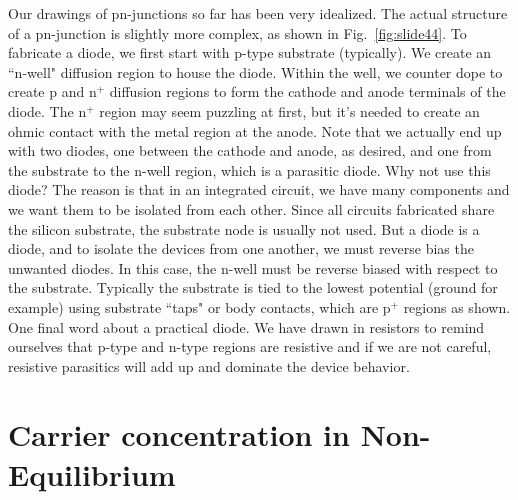 Our drawings of pn-junctions so far has been very idealized.  The actual structure of a pn-junction is slightly more complex, as shown in Fig.~\ref{fig:slide44}.  To fabricate a diode, we first start with p-type substrate (typically).  We create an ``n-well" diffusion region  to house the diode.  Within the well, we counter dope to create p and n$^+$ diffusion regions to form  the cathode and anode terminals of the diode.  The n$^+$ region may seem puzzling at first, but it's needed to create an ohmic contact with the metal region at the anode.  Note that we actually end up with two diodes, one between the cathode and anode, as desired, and one from the substrate to the n-well region, which is a parasitic diode.  Why not use this diode?  The reason is that in an integrated circuit, we have many components and we want them to be isolated from each other.  Since all circuits fabricated share the silicon substrate, the substrate node is usually not used.  But a diode is a diode, and to isolate the devices from one another, we must reverse bias the unwanted diodes.  In this case, the n-well must be reverse biased with respect to the substrate.  Typically the substrate is tied to the lowest potential (ground for example) using substrate ``taps" or body contacts, which are p$^+$ regions as shown.  One final word about a practical diode.  We have drawn in resistors to remind ourselves that p-type and n-type regions are resistive and if we are not careful, resistive parasitics will add up and dominate the device behavior.  
\section{Carrier concentration in Non-Equilibrium}
